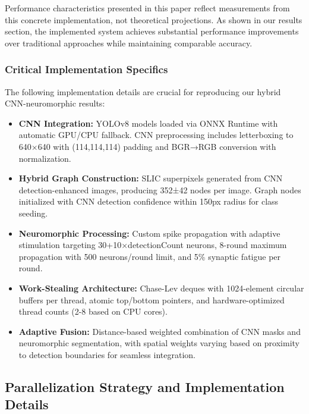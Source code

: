 \documentclass[conference]{IEEEtran}
\begin{document}
Performance characteristics presented in this paper reflect measurements from this concrete implementation, not theoretical projections. As shown in our results section, the implemented system achieves substantial performance improvements over traditional approaches while maintaining comparable accuracy.

\subsubsection{Critical Implementation Specifics}
The following implementation details are crucial for reproducing our hybrid CNN-neuromorphic results:

\begin{itemize}
    \item \textbf{CNN Integration:} YOLOv8 models loaded via ONNX Runtime with automatic GPU/CPU fallback. CNN preprocessing includes letterboxing to 640×640 with (114,114,114) padding and BGR→RGB conversion with normalization.
    
    \item \textbf{Hybrid Graph Construction:} SLIC superpixels \cite{Achanta2012} generated from CNN detection-enhanced images, producing 352±42 nodes per image. Graph nodes initialized with CNN detection confidence within 150px radius for class seeding.
    
    \item \textbf{Neuromorphic Processing:} Custom spike propagation with adaptive stimulation targeting 30+10×detectionCount neurons, 8-round maximum propagation with 500 neurons/round limit, and 5\% synaptic fatigue per round.
    
    \item \textbf{Work-Stealing Architecture:} Chase-Lev deques \cite{Chase2005} with 1024-element circular buffers per thread, atomic top/bottom pointers, and hardware-optimized thread counts (2-8 based on CPU cores).
    
    \item \textbf{Adaptive Fusion:} Distance-based weighted combination of CNN masks and neuromorphic segmentation, with spatial weights varying based on proximity to detection boundaries for seamless integration.
\end{itemize}


\subsection{Parallelization Strategy and Implementation Details}
\end{document}
